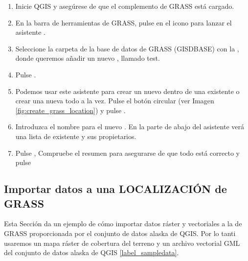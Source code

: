 \begin{enumerate}
  \item Inicie QGIS y asegúrese de que el complemento de GRASS está cargado.
  \item En la barra de herramientas de GRASS, pulse en el icono 
   para lanzar el asistente
  .
  \item Seleccione la carpeta de la base de datos de GRASS (GISDBASE)  
  con la , donde queremos añadir un nuevo 
  , llamado test.
  \item Pulse . 
  \item Podemos usar este asistente para crear un nuevo  dentro de 
  una  existente o crear una nueva  
  todo a la vez. Pulse el botón circular
  (ver Imagen \ref{fig:create_grass_location}) y pulse .
  \item Introduzca el nombre  para el nuevo . En la parte de abajo 
  del asistente verá una lista de  existente y sus propietarios.
  \item Pulse , Compruebe el resumen para asegurarse de que todo está correcto y pulse  
\end{enumerate}

\subsection{Importar datos a una LOCALIZACIÓN de GRASS}\label{sec:import_loc_data}

Esta Sección da un ejemplo de cómo importar datos ráster y vectoriales a la 
 de GRASS proporcionada por el conjunto de datos alaska de QGIS. Por lo tanti usaremos un mapa ráster de cobertura
del terreno  y un archivo vectorial GML  del conjunto de datos alaska de QGIS \ref{label_sampledata}.

